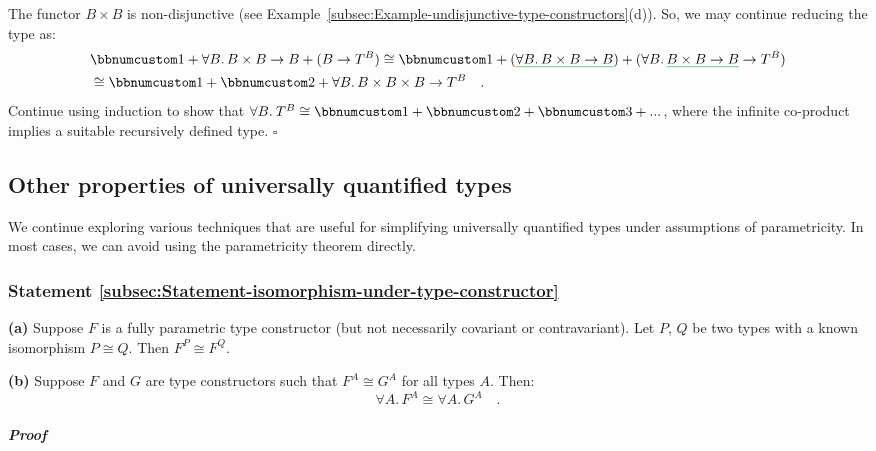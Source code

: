 The functor $B\times B$ is non-disjunctive (see Example~\ref{subsec:Example-undisjunctive-type-constructors}(d)).
So, we may continue reducing the type as:
\begin{align*}
 & \bbnum 1+\forall B.\,B\times B\rightarrow B+(B\rightarrow T^{B})\cong\bbnum 1+(\gunderline{\forall B.\,B\times B\rightarrow B})+(\forall B.\,\gunderline{B\times B\rightarrow B}\rightarrow T^{B})\\
 & \cong\bbnum 1+\bbnum 2+\forall B.\,B\times B\times B\rightarrow T^{B}\quad.
\end{align*}
Continue using induction to show that $\forall B.\:T^{B}\cong\bbnum 1+\bbnum 2+\bbnum 3+...$,
where the infinite co-product implies a suitable recursively defined
type. $\square$

\subsection{Other properties of universally quantified types}

We continue exploring various techniques that are useful for simplifying
universally quantified types under assumptions of parametricity. In
most cases, we can avoid using the parametricity theorem directly.

\subsubsection{Statement \label{subsec:Statement-isomorphism-under-type-constructor}\ref{subsec:Statement-isomorphism-under-type-constructor}}

\textbf{(a)} Suppose $F$ is a fully parametric type constructor (but
not necessarily covariant or contravariant). Let $P$, $Q$ be two
types with a known isomorphism $P\cong Q$. Then $F^{P}\cong F^{Q}$.

\textbf{(b)} Suppose $F$ and $G$ are type constructors such that
$F^{A}\cong G^{A}$ for all types $A$. Then:
\[
\forall A.\,F^{A}\cong\forall A.\,G^{A}\quad.
\]


\subparagraph{Proof}

